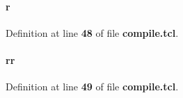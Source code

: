 \paragraph[{r}]{\setlength{\rightskip}{0pt plus 5cm}r}\label{rx__path__top_2smpl__cnt_2compile_8tcl_a514f1b439f404f86f77090fa9edc96ce}


Definition at line {\bf 48} of file {\bf compile.\+tcl}.

\paragraph[{rr}]{\setlength{\rightskip}{0pt plus 5cm}rr}\label{rx__path__top_2smpl__cnt_2compile_8tcl_aeb9279982226a42afdf2860dbdc29b45}


Definition at line {\bf 49} of file {\bf compile.\+tcl}.

